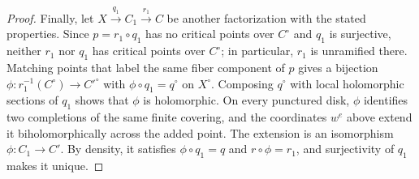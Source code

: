 \begin{proof}
Finally, let $X\xrightarrow{q_1}C_1\xrightarrow{r_1}C$ be another
factorization with the stated properties. Since $p=r_1\circ q_1$
has no critical points over $C^\circ$ and $q_1$ is surjective,
neither $r_1$ nor $q_1$ has critical points over $C^\circ$; in
particular, $r_1$ is unramified there. Matching
points that label the same fiber component of $p$ gives a
bijection $\phi\colon r_1^{-1}(C^\circ)\to C'^\circ$ with
$\phi\circ q_1=q^\circ$ on $X^\circ$. Composing $q^\circ$ with
local holomorphic sections of $q_1$ shows that $\phi$ is
holomorphic. On every punctured disk, $\phi$ identifies two
completions of the same finite covering, and the coordinates
$w^e$ above extend it biholomorphically across the added
point. The extension is an isomorphism $\phi\colon C_1\to C'$.
By density, it satisfies $\phi\circ q_1=q$ and $r\circ\phi=r_1$,
and surjectivity of $q_1$ makes it unique.
\end{proof}
